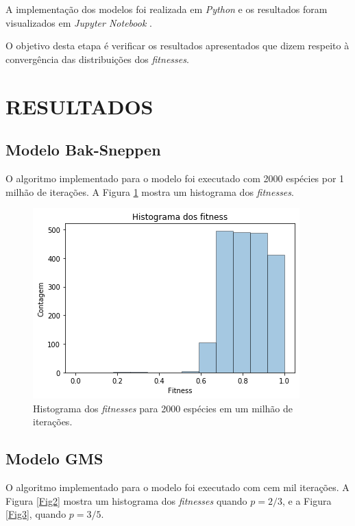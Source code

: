 \documentclass[10pt,brazil,english]{article}
\begin{document}
        A implementação dos modelos foi realizada em \textit{Python} e os resultados foram visualizados em \textit{Jupyter Notebook} \cite{domingues2019github}.

        O objetivo desta etapa é verificar os resultados apresentados que dizem respeito à convergência das distribuições dos \textit{fitnesses}.

    \section{RESULTADOS}

        \subsection{Modelo Bak-Sneppen}

            O algoritmo implementado para o modelo foi executado com 2000 espécies por 1 milhão de iterações.
            A Figura \ref{Fig1} mostra um histograma dos \textit{fitnesses}.

            \begin{figure}[!hbtp]
                \begin{center}
                    \includegraphics[scale=0.5]{Images/5-1.png}
                \end{center}
                \caption{Histograma dos \textit{fitnesses} para 2000 espécies em um milhão de iterações.}
                \label{Fig1}
            \end{figure}

        \subsection{Modelo GMS}

            O algoritmo implementado para o modelo foi executado com cem mil iterações.
            A Figura \ref{Fig2} mostra um histograma dos \textit{fitnesses} quando $p = 2/3$, e a Figura \ref{Fig3}, quando $p = 3/5$.
\end{document}
